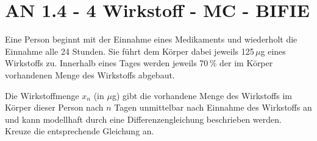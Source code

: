 \section{AN 1.4 - 4 Wirkstoff - MC - BIFIE}

\begin{beispiel}[AN 1.4]{1} %
Eine Person beginnt mit der Einnahme eines Medikaments und wiederholt die Einnahme alle 24 Stunden. Sie führt dem Körper dabei jeweils 125\,$\mu$g eines Wirkstoffs zu. Innerhalb eines Tages werden jeweils 70\,\% der im Körper vorhandenen Menge des Wirkstoffs abgebaut. 
\leer

Die Wirkstoffmenge $x_n$ (in $\mu$g) gibt die vorhandene Menge des Wirkstoffs im Körper dieser Person nach $n$ Tagen unmittelbar nach Einnahme des Wirkstoffs an und kann modellhaft durch eine Differenzengleichung beschrieben werden.\\
Kreuze die entsprechende Gleichung an. 

\end{beispiel}